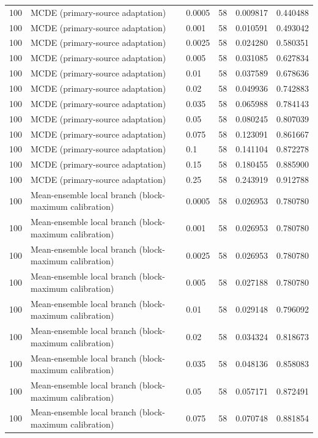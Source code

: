 \begin{tabular}{llllll}
100 & MCDE (primary-source adaptation) & 0.0005 & 58 & 0.009817 & 0.440488 \\
100 & MCDE (primary-source adaptation) & 0.001 & 58 & 0.010591 & 0.493042 \\
100 & MCDE (primary-source adaptation) & 0.0025 & 58 & 0.024280 & 0.580351 \\
100 & MCDE (primary-source adaptation) & 0.005 & 58 & 0.031085 & 0.627834 \\
100 & MCDE (primary-source adaptation) & 0.01 & 58 & 0.037589 & 0.678636 \\
100 & MCDE (primary-source adaptation) & 0.02 & 58 & 0.049936 & 0.742883 \\
100 & MCDE (primary-source adaptation) & 0.035 & 58 & 0.065988 & 0.784143 \\
100 & MCDE (primary-source adaptation) & 0.05 & 58 & 0.080245 & 0.807039 \\
100 & MCDE (primary-source adaptation) & 0.075 & 58 & 0.123091 & 0.861667 \\
100 & MCDE (primary-source adaptation) & 0.1 & 58 & 0.141104 & 0.872278 \\
100 & MCDE (primary-source adaptation) & 0.15 & 58 & 0.180455 & 0.885900 \\
100 & MCDE (primary-source adaptation) & 0.25 & 58 & 0.243919 & 0.912788 \\
100 & Mean-ensemble local branch (block-maximum calibration) & 0.0005 & 58 & 0.026953 & 0.780780 \\
100 & Mean-ensemble local branch (block-maximum calibration) & 0.001 & 58 & 0.026953 & 0.780780 \\
100 & Mean-ensemble local branch (block-maximum calibration) & 0.0025 & 58 & 0.026953 & 0.780780 \\
100 & Mean-ensemble local branch (block-maximum calibration) & 0.005 & 58 & 0.027188 & 0.780780 \\
100 & Mean-ensemble local branch (block-maximum calibration) & 0.01 & 58 & 0.029148 & 0.796092 \\
100 & Mean-ensemble local branch (block-maximum calibration) & 0.02 & 58 & 0.034324 & 0.818673 \\
100 & Mean-ensemble local branch (block-maximum calibration) & 0.035 & 58 & 0.048136 & 0.858083 \\
100 & Mean-ensemble local branch (block-maximum calibration) & 0.05 & 58 & 0.057171 & 0.872491 \\
100 & Mean-ensemble local branch (block-maximum calibration) & 0.075 & 58 & 0.070748 & 0.881854 \\

\end{tabular}
